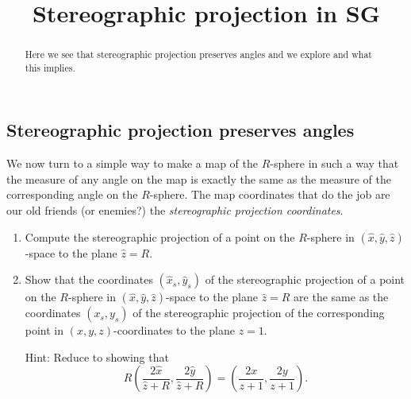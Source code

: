 \documentclass{ximera}
\title{Stereographic projection in SG}
\begin{document}
\begin{abstract}
Here we see that stereographic projection preserves angles and we
explore and what this implies. 
\end{abstract}
\maketitle


\subsection*{Stereographic projection preserves angles}

We now turn to a simple way to make a map of the $R$-sphere in such a
way that the measure of any angle on the map is exactly the same as
the measure of the corresponding angle on the $R$-sphere. The map
coordinates that do the job are our old friends (or enemies?) the
\textit{stereographic projection coordinates}.

\begin{exercise}\hfil
\begin{enumerate}
\item Compute the stereographic projection of a point on the
  $R$-sphere in $\left( \hat{x},\hat{y},\hat{z}\right) $-space to the
  plane $\hat{z}=R$.

\item Show that the coordinates $\left( \hat{x}_{s},\hat{y}_{s}\right)
  $ of the stereographic projection of a point on the $R$-sphere in
  $\left( \hat{x},\hat{y},\hat{z}\right) $-space to the plane
  $\hat{z}=R$ are the same as the coordinates $\left(
  x_{s},y_{s}\right) $ of the stereographic projection of the
  corresponding point in $\left( x,y,z\right) $-coordinates to the
  plane $z=1$.

Hint: Reduce to showing that%
\[
R\left(  \frac{2\hat{x}}{\hat{z}+R},\frac{2\hat{y}}{\hat{z}+R}\right)
=\left(  \frac{2x}{z+1},\frac{2y}{z+1}\right)  .
\]
\end{enumerate}
\end{exercise}
\end{document}
